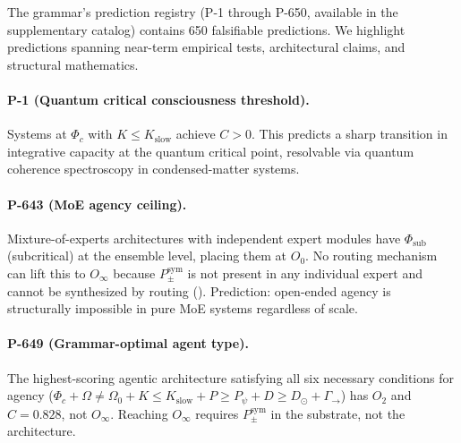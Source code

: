 \documentclass[12pt,a4paper]{article}
\newcommand{\Phic}{\Phi_c}
\newcommand{\Ppms}{P_{\pm}^{\text{sym}}}
\newcommand{\Oinf}{O_\infty}
\newcommand{\Otwo}{O_2}
\newcommand{\Ozero}{O_0}
\begin{document}
The grammar's prediction registry (P-1 through P-650, available in
the supplementary catalog) contains 650 falsifiable predictions.
We highlight predictions spanning near-term empirical tests,
architectural claims, and structural mathematics.

\paragraph{P-1 (Quantum critical consciousness threshold).}
Systems at $\Phic$ with $K \leq K_\text{slow}$ achieve $C > 0$.
This predicts a sharp transition in integrative capacity at the
quantum critical point, resolvable via quantum coherence
spectroscopy in condensed-matter systems.

\paragraph{P-643 (MoE agency ceiling).}
Mixture-of-experts architectures with independent expert modules
have $\Phi_\text{sub}$ (subcritical) at the ensemble level, placing
them at $\Ozero$. No routing mechanism can lift this to $\Oinf$
because $\Ppms$ is not present in any individual expert and cannot
be synthesized by routing (). Prediction:
open-ended agency is structurally impossible in pure MoE systems
regardless of scale.

\paragraph{P-649 (Grammar-optimal agent type).}
The highest-scoring agentic architecture satisfying all six necessary
conditions for agency
($\Phic + \Omega \neq \Omega_0 + K \leq K_\text{slow} + P \geq P_\psi + D \geq D_\odot + \Gamma_{\to}$)
has $\Otwo$ and $C = 0.828$, not $\Oinf$. Reaching $\Oinf$ requires
$\Ppms$ in the substrate, not the architecture.
\end{document}
